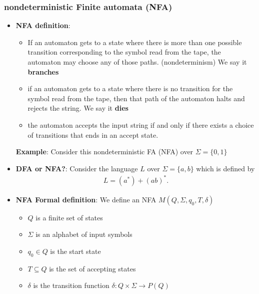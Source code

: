 \documentclass{report}
\begin{document}
    \pagebreak 
    \subsubsection{nondeterministic Finite automata (NFA)}
    \begin{itemize}
        \item \textbf{NFA definition}:
            \begin{itemize}
                \item If an automaton gets to a state where there is more than one possible transition corresponding to the symbol read from the tape, the automaton may  choose any of those paths. (nondeterminism) We say it \textbf{branches}
                \item if an automaton gets to a state where there is no transition for the symbol read from the tape, then that path of the automaton halts and rejects the string. We say it \textbf{dies}
                \item the automaton accepts the input string if and only if there exists a choice of transitions that ends in an accept state.
            \end{itemize}
            \bigbreak \noindent 
            \textbf{Example}: Consider this nondeterministic FA (NFA) over $\Sigma = \{0, 1\}$
            \bigbreak \noindent 
        \item \textbf{DFA or NFA?}:
            Consider the language $L$ over $\Sigma = \{a, b\}$ which is defined by
            \begin{align*}
                L = (a^{*}) + (ab)^{*}
            .\end{align*}
            \bigbreak \noindent 
        \item \textbf{NFA Formal definition}: We define an NFA $M(Q, \Sigma, q_{0}, T, \delta) $
            \begin{itemize}
                \item $Q$ is a finite set of states
                \item $\Sigma$ is an alphabet of input symbols
                \item $q_0 \in Q$ is the start state
                \item $T \subseteq Q$ is the set of accepting states
                \item $\delta$ is the transition function $\delta: Q \times \Sigma \to P(Q)$
            \end{itemize}

\end{itemize}
\end{document}
